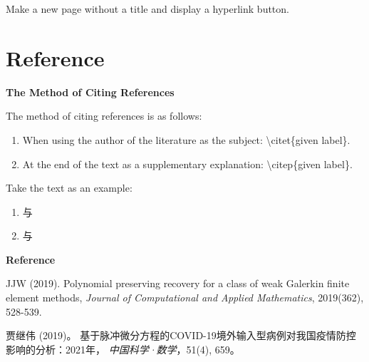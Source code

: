 \documentclass[12pt, aspectratio=169]{beamer}
\begin{document}
\begin{frame}

	Make a new page without a title and display a hyperlink button.
	
	\bigskip
	
	\hyperlink{Linked_text}{}
	
\end{frame}

\section{Reference}
\linespread{1} 
\begin{frame}{\textbf{The Method of Citing References}}
\linespread{1.5}

	The method of citing references is as follows:
	
	\begin{enumerate}[1]
		\item When using the author of the literature as the subject: \textbackslash citet\{given label\}.
		\item At the end of the text as a supplementary explanation: \textbackslash citep\{given label\}.
	\end{enumerate}
	
	\bigskip

	Take the text as an example:
	
	\begin{enumerate}[1]
		\item \citet{Polynomial_Galerkin} 与 \citet{脉冲微分方程COVID-19}
		\item \citep{Polynomial_Galerkin} 与 \citep{脉冲微分方程COVID-19}
	\end{enumerate}
	
\end{frame}


\linespread{1} 
\begin{frame}{\textbf{Reference}}
\linespread{1.5} 

\footnotesize

\begin{thebibliography}{99} 

		JJW (2019). 
		\newblock Polynomial preserving recovery for a class of weak Galerkin finite element methods, 
		\newblock \emph{Journal of Computational and Applied Mathematics}, 2019(362), 528-539. 

		贾继伟 (2019)。 
		\newblock 基于脉冲微分方程的COVID-19境外输入型病例对我国疫情防控影响的分析：2021年，
		\newblock \emph{中国科学·数学}，51(4), 659。
		
\end{thebibliography}

\end{frame}
\end{document}
